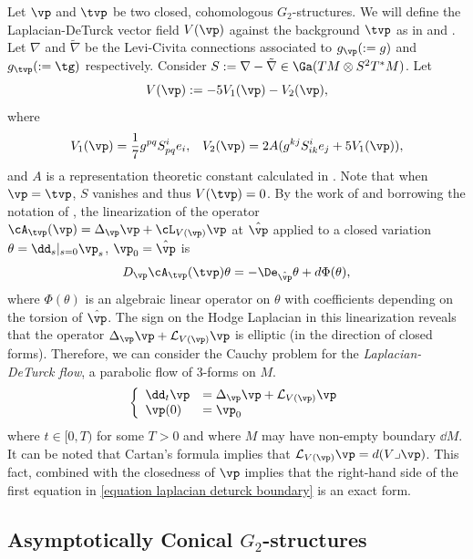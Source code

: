 \documentclass[hidelinks, 12pt, oneside, reqno]{amsart}
\begin{document}
Let $\vp$ and $\tvp$ be two closed, cohomologous $G_2$-structures. We will define the Laplacian-DeTurck vector field $V(\vp)$ against the background $\tvp$ as in \cite{BryantXu} and \cite{LotayWeiStability}. Let $\nabla$ and $\tilde \nabla$ be the Levi-Civita connections associated to $g_{\vp} (:= g)$ and $g_{\tvp} (:= \tg)$ respectively. Consider $S := \nabla - \tilde \nabla \in \Ga (TM \otimes S^2T^*M)$. Let
\begin{equation}\label{equation def deturck}
V(\vp) := - 5V_1(\vp) - V_2(\vp),    
\end{equation}
where 
\[
V_1(\vp) = \frac17 g^{pq}S^i_{pq}e_i, \;\;\; V_2(\vp) = 2A(g^{kj}S^i_{ik}e_j + 5V_1(\vp)),
\]
and $A$ is a representation theoretic constant calculated in \cite{BryantXu}. Note that when $\vp = \tvp$, $S$ vanishes and thus $V(\tvp) = 0$. By the work of \cite{BryantXu} and borrowing the notation of \cite{LotayWeiStability}, the linearization of the operator $\cA_{\tvp}(\vp) = \Delta_\vp \vp + \cL_{V(\vp)} \vp$ at $\hat \vp$ applied to a closed variation $\theta = \dd_s|_{s=0} \vp_s$, $\vp_0 = \hat \vp$ is
\[
D_\vp \cA_{\tvp}(\tvp) \theta = -\De_{\hat \vp} \theta + d\Phi (\theta),
\]
where $\Phi(\theta)$ is an algebraic linear operator on $\theta$ with coefficients depending on the torsion of $\hat \vp$. The sign on the Hodge Laplacian in this linearization reveals that the operator $\Delta_\vp \vp + \mathcal{L}_{V(\vp)}\vp$ is elliptic (in the direction of closed forms). Therefore, we can consider the Cauchy problem for the \textit{Laplacian-DeTurck flow}, a parabolic flow of 3-forms on $M$.
\begin{equation}\label{equation laplacian deturck boundary}
    \left\{
    \begin{array}{ll}
      \dd_t \vp &=   \Delta_{\vp} \vp + \mathcal{L}_{V(\vp)}\vp\\
      \vp(0) &= \vp_0
    \end{array}
  \right.
\end{equation}
where $t \in [0,T)$ for some $T>0$ and where $M$ may have non-empty boundary $\dd M$. It can be noted that Cartan's formula implies that $\mathcal{L}_{V(\vp)}\vp = d(V\lrcorner \vp)$. This fact, combined with the closedness of $\vp$ implies that the right-hand side of the first equation in \eqref{equation laplacian deturck boundary} is an exact form.

\subsection{Asymptotically Conical $G_2$-structures}
\end{document}
